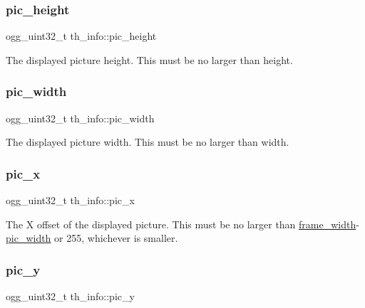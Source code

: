 \subsubsection{\texorpdfstring{pic\+\_\+height}{pic\_height}}
{\footnotesize\ttfamily ogg\+\_\+uint32\+\_\+t th\+\_\+info\+::pic\+\_\+height}

The displayed picture height. This must be no larger than height. \mbox{\label{structth__info_a5048edf77b141dd3e9a92ca85e317345}} 
\subsubsection{\texorpdfstring{pic\+\_\+width}{pic\_width}}
{\footnotesize\ttfamily ogg\+\_\+uint32\+\_\+t th\+\_\+info\+::pic\+\_\+width}

The displayed picture width. This must be no larger than width. \mbox{\label{structth__info_a5b3f834bcf141564e7bb14f49101870f}} 
\subsubsection{\texorpdfstring{pic\+\_\+x}{pic\_x}}
{\footnotesize\ttfamily ogg\+\_\+uint32\+\_\+t th\+\_\+info\+::pic\+\_\+x}

The X offset of the displayed picture. This must be no larger than \hyperlink{structth__info_a6b8087a4d831da53011a43b8d74087a0}{frame\+\_\+width}-\/\hyperlink{structth__info_a5048edf77b141dd3e9a92ca85e317345}{pic\+\_\+width} or 255, whichever is smaller. \mbox{\label{structth__info_a8aacc575cab2dfe3735001c2ad32aa14}} 
\subsubsection{\texorpdfstring{pic\+\_\+y}{pic\_y}}
{\footnotesize\ttfamily ogg\+\_\+uint32\+\_\+t th\+\_\+info\+::pic\+\_\+y}

